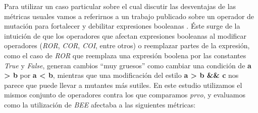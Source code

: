 Para utilizar un caso particular sobre el cual discutir las desventajas de las m\'etricas usuales vamos a referirnos a un trabajo publicado sobre un operador de mutaci\'on para fortalecer y debilitar expresiones booleanas \cite{bibliography.mutation.operators.beeBridaS17}. \'Este surge de la intuici\'on de que los operadores que afectan expresiones booleanas al modificar operadores (\emph{ROR}, \emph{COR}, \emph{COI}, entre otros) o reemplazar partes de la expresi\'on, como el caso de \emph{ROR} que reemplaza una expresi\'on boolena por las constantes \emph{True} y \emph{False}, generan cambios ``muy gruesos'' como cambiar una condici\'on de \textbf{a > b} por \textbf{a < b}, mientras que una modificaci\'on del estilo \textbf{a > b \&\& c} nos parece que puede llevar a mutantes m\'as sutiles. En este estudio utilizamos el mismos conjunto de operadores contra los que comparamos \emph{prvo}, y evaluamos como la utilizaci\'on de \emph{BEE} afectaba a las siguientes m\'etricas:
